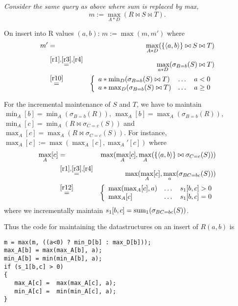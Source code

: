 \begin{example}\em
Consider the same query as above where sum is replaced by max,
\[
m := \max_{A*D}(R \bowtie S \bowtie T).
\]

On insert into R values $(a,b)$: $m := \max(m, m')$ where
\begin{eqnarray*}
m' &=&
\max_{A*D}(\{{\langle a,b\rangle}\} \bowtie S \bowtie T)
\\
&\stackrel{\ref{r1},\ref{r3},\ref{r4}}{=}&
\max_{a*D}(\sigma_{B=b}(S) \bowtie T)
\\
&\stackrel{\ref{r10}}{=}&
\left\{
\begin{array}{lll}
a * \min_{D}(\sigma_{B=b}(S) \bowtie T) & \dots & a < 0 \\
a * \max_{D}(\sigma_{B=b}(S) \bowtie T) & \dots & a \ge 0
\end{array}
\right.
\end{eqnarray*}

For the incremental maintenance of $S$ and $T$, we have to maintain
$\min_A[b] = \min_A(\sigma_{B=b}(R))$,
$\max_A[b] = \max_A(\sigma_{B=b}(R))$,
$\min_A[c] = \min_A(R \bowtie \sigma_{C=c}(S))$ and
$\max_A[c] = \max_A(R \bowtie \sigma_{C=c}(S))$.
For instance,
$\max_A[c] := \max(\max_A[c], \max_A'[c])$
where
\begin{eqnarray*}
\max_A[c] &=&
\max(\max_A[c], \max_A(\{{\langle a,b\rangle}\} \bowtie \sigma_{C=c}(S)))
\\
&\stackrel{\ref{r1},\ref{r3},\ref{r4}}{=}&
\max(\max_A[c], \max_a(\sigma_{BC=bc}(S)))
\\
&\stackrel{\ref{r12}}{=}&
\left\{
\begin{array}{lll}
\max(\max_A[c], a) & \dots & s_1[b,c] > 0 \\
\max_A[c]          & \dots & s_1[b,c] = 0
\end{array}
\right.
\end{eqnarray*}
where we incrementally maintain
$s_1[b,c] = \mathrm{sum}_1(\sigma_{BC=bc}(S))$.

Thus the code for maintaining the datastructures on an insert of $R(a,b)$ is
\begin{verbatim}
m = max(m, ((a<0) ? min_D[b] : max_D[b]));
max_A[b] = max(max_A[b], a);
min_A[b] = min(min_A[b], a);
if (s_1[b,c] > 0)
{
   max_A[c] =  max(max_A[c], a);
   min_A[c] =  min(min_A[c], a);
}
\end{verbatim}
\punto
\end{example}

\newcommand{\compile}{\ensuremath{\mbox{\sc Compile}}}
\newcommand{\generate}{\ensuremath{\mbox{\sc Generate}}}
\newcommand{\rewrite}{\ensuremath{\mbox{\sc Rewrite}}}
\newcommand{\substitute}{\ensuremath{\mbox{\sc Substitute}}}
\newcommand{\match}{\ensuremath{\mbox{\sc Match}}}

